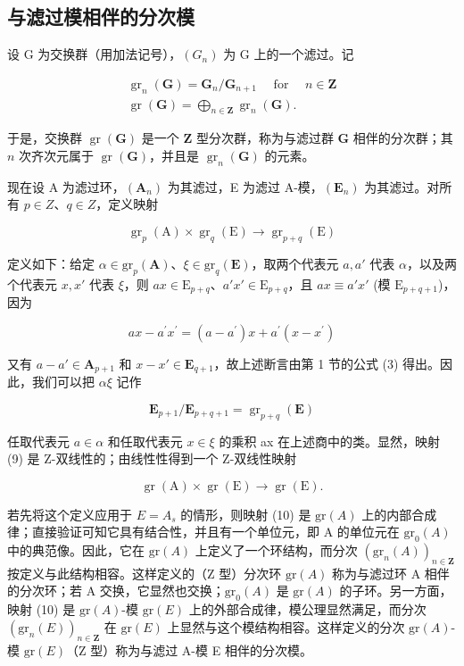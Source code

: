 \subsection{与滤过模相伴的分次模}

设 G 为交换群（用加法记号），\((G_{n})\) 为 G 上的一个滤过。记

\[
\begin{array}{l} \operatorname{gr} _ {n} (\mathbf {G}) = \mathbf {G} _ {n} / \mathbf {G} _ {n + 1} \quad \text { for } \quad n \in \mathbf {Z} \\ \operatorname{gr} (\mathbf {G}) = \bigoplus_ {n \in \mathbf {Z}} \operatorname{gr} _ {n} (\mathbf {G}). \end{array}\tag{8}
\]

	于是，交换群 \(\operatorname{gr}(\mathbf{G})\) 是一个 \(\mathbf{Z}\) 型分次群，称为与滤过群 \(\mathbf{G}\) 相伴的分次群；其 \(n\) 次齐次元属于 \(\operatorname{gr}(\mathbf{G})\)，并且是 \(\operatorname{gr}_n(\mathbf{G})\) 的元素。

现在设 A 为滤过环，\((\mathbf{A}_{n})\) 为其滤过，E 为滤过 A-模，\((\mathbf{E}_{n})\) 为其滤过。对所有 \(p \in Z\)、\(q \in Z\)，定义映射

\[
\operatorname{gr} _ {p} (\mathrm{A}) \times \operatorname{gr} _ {q} (\mathrm{E}) \rightarrow \operatorname{gr} _ {p + q} (\mathrm{E})\tag{9}
\]

	定义如下：给定 \(\alpha \in \mathrm{gr}_p(\mathbf{A})\)、\(\xi \in \mathrm{gr}_q(\mathbf{E})\)，取两个代表元 \(a, a'\) 代表 \(\alpha\)，以及两个代表元 \(x, x'\) 代表 \(\xi\)，则 \(ax \in \mathrm{E}_{p + q}\)、\(a'x' \in \mathrm{E}_{p + q}\)，且 \(ax \equiv a'x'\) (模 \(\mathrm{E}_{p + q + 1}\))，因为

\[
a x - a ^ {\prime} x ^ {\prime} = (a - a ^ {\prime}) x + a ^ {\prime} (x - x ^ {\prime})
\]

	又有 \(a - a' \in \mathbf{A}_{p+1}\) 和 \(x - x' \in \mathbf{E}_{q+1}\)，故上述断言由第 1 节的公式 (3) 得出。因此，我们可以把 \(\alpha\xi\) 记作

\[
\mathbf {E} _ {p + 1} / \mathbf {E} _ {p + q + 1} = \operatorname{gr} _ {p + q} (\mathbf {E})
\]

	任取代表元 \(a \in \alpha\) 和任取代表元 \(x \in \xi\) 的乘积 ax 在上述商中的类。显然，映射 (9) 是 Z-双线性的；由线性性得到一个 Z-双线性映射

\[
\operatorname{gr} (\mathrm{A}) \times \operatorname{gr} (\mathrm{E}) \rightarrow \operatorname{gr} (\mathrm{E}).\tag{10}
\]

	若先将这个定义应用于 \(E = A_{s}\) 的情形，则映射 (10) 是 \(\mathrm{gr}(A)\) 上的内部合成律；直接验证可知它具有结合性，并且有一个单位元，即 A 的单位元在 \(\mathrm{gr}_{0}(A)\) 中的典范像。因此，它在 \(\mathrm{gr}(A)\) 上定义了一个环结构，而分次 \((\mathrm{gr}_{n}(A))_{n\in\mathbf{Z}}\) 按定义与此结构相容。这样定义的（Z 型）分次环 \(\mathrm{gr}(A)\) 称为与滤过环 A 相伴的分次环；若 A 交换，它显然也交换；\(\mathrm{gr}_{0}(A)\) 是 \(\mathrm{gr}(A)\) 的子环。另一方面，映射 (10) 是 \(\mathrm{gr}(A)\)-模 \(\mathrm{gr}(E)\) 上的外部合成律，模公理显然满足，而分次 \((\mathrm{gr}_{n}(E))_{n\in\mathbf{Z}}\) 在 \(\mathrm{gr}(E)\) 上显然与这个模结构相容。这样定义的分次 \(\mathrm{gr}(A)\)-模 \(\mathrm{gr}(E)\)（Z 型）称为与滤过 A-模 E 相伴的分次模。


